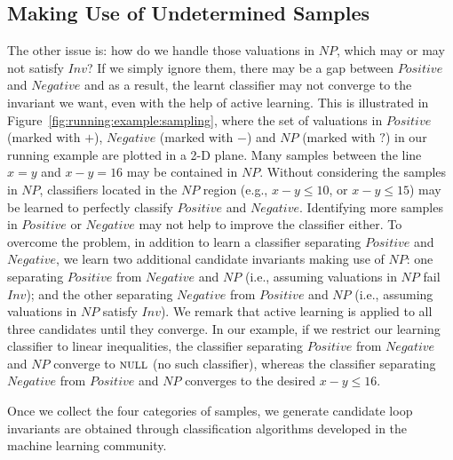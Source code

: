 \subsection{Making Use of Undetermined Samples} \label{alternative}
The other issue is: how do we handle those valuations in $NP$, which may or may not satisfy $Inv$? If we simply ignore them, there may be a gap between $Positive$ and $Negative$ and as a result, the learnt classifier may not converge to the invariant we want, even with the help of active learning.
This is illustrated in Figure~\ref{fig:running:example:sampling}, where the set of valuations in $Positive$ (marked with $+$), $Negative$ (marked with $-$) and $NP$ (marked with $?$) in our running example are plotted in a 2-D plane. Many samples between the line $x=y$ and $x-y=16$ may be contained in $NP$. Without considering the samples in $NP$, classifiers located in the $NP$ region (e.g., $x - y \leq 10$, or $x - y \leq 15$) may be learned to perfectly classify $Positive$ and $Negative$. Identifying more samples in $Positive$ or $Negative$ may not help to improve the classifier either. To overcome the problem, in addition to learn a classifier separating $Positive$ and $Negative$, we learn two additional candidate invariants making use of $NP$:
one separating $Positive$ from $Negative$ and $NP$ (i.e., assuming valuations in $NP$ fail $Inv$);
and the other separating $Negative$ from $Positive$ and $NP$ (i.e., assuming valuations in $NP$ satisfy $Inv$).
We remark that active learning is applied to all three candidates until they converge.
In our example, if we restrict our learning classifier to linear inequalities, the classifier separating $Positive$ from $Negative$ and $NP$ converge to $\textsc{null}$ (no such classifier), whereas the classifier separating $Negative$ from $Positive$ and $NP$ converges to the desired $x - y \leq 16$.

Once we collect the four categories of samples, we generate candidate loop invariants are obtained through classification algorithms developed in the machine learning community.

